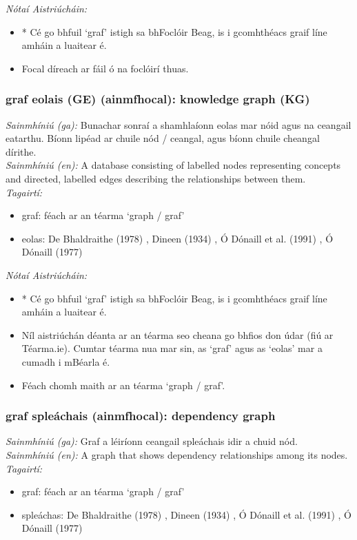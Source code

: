  \noindent \textit{Nótaí Aistriúcháin:}
\begin{itemize}
	\item * Cé go bhfuil `graf' istigh sa bhFoclóir Beag, is i gcomhthéacs graif líne amháin a luaitear é.
	\item Focal díreach ar fáil ó na foclóirí thuas.
\end{itemize}


\subsubsection*{graf eolais (GE) (ainmfhocal): knowledge graph (KG)}
 \noindent \textit{Sainmhíniú (ga):} Bunachar sonraí a shamhlaíonn eolas mar nóid agus na ceangail eatarthu. Bíonn lipéad ar chuile nód / ceangal, agus bíonn chuile cheangal dírithe.
\\
 \noindent \textit{Sainmhíniú (en):} A database consisting of labelled nodes representing concepts and directed, labelled edges describing the relationships between them.
\\
 \noindent \textit{Tagairtí:}
\begin{itemize}
	\item graf: féach ar an téarma `graph / graf'
	\item eolas: De Bhaldraithe (1978) \cite{de-bhaldraithe}, Dineen (1934) \cite{dineen}, Ó Dónaill et al. (1991) \cite{focloir-beag}, Ó Dónaill (1977) \cite{odonaill}
\end{itemize}

 \noindent \textit{Nótaí Aistriúcháin:}
\begin{itemize}
	\item * Cé go bhfuil `graf' istigh sa bhFoclóir Beag, is i gcomhthéacs graif líne amháin a luaitear é.
	\item Níl aistriúchán déanta ar an téarma seo cheana go bhfios don údar (fiú ar Téarma.ie). Cumtar téarma nua mar sin, as `graf' agus as `eolas' mar a cumadh i mBéarla é.
	\item Féach chomh maith ar an téarma `graph / graf'.
\end{itemize}


\subsubsection*{graf spleáchais (ainmfhocal): dependency graph}
 \noindent \textit{Sainmhíniú (ga):} Graf a léiríonn ceangail spleáchais idir a chuid nód.
\\
 \noindent \textit{Sainmhíniú (en):} A graph that shows dependency relationships among its nodes.
\\
 \noindent \textit{Tagairtí:}
\begin{itemize}
	\item graf: féach ar an téarma `graph / graf'
	\item spleáchas: De Bhaldraithe (1978) \cite{de-bhaldraithe}, Dineen (1934) \cite{dineen}, Ó Dónaill et al. (1991) \cite{focloir-beag}, Ó Dónaill (1977) \cite{odonaill}
\end{itemize}

